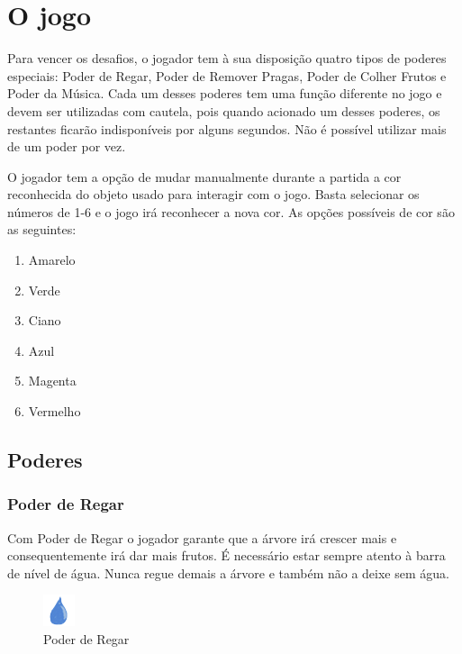 \documentclass[12pt]{article}
\begin{document}
\section{O jogo}

 Para vencer os desafios, o jogador tem \`a sua disposi\c c\~ao quatro tipos de poderes especiais: Poder de Regar,
 Poder de Remover Pragas, Poder de Colher Frutos e Poder da M\'usica. Cada um desses poderes tem uma fun\c c\~ao
 diferente no jogo e devem ser utilizadas com cautela, pois quando acionado um desses poderes, os restantes ficar\~ao
 indispon\'iveis por alguns segundos. N\~ao \'e poss\'ivel utilizar mais de um poder por vez.

 O jogador tem a op\c c\~ao de mudar manualmente durante a partida a cor reconhecida do objeto usado para interagir com o jogo.
 Basta selecionar os n\'umeros de 1-6 e o jogo ir\'a reconhecer a nova cor. As op\c c\~oes poss\'iveis de cor s\~ao as
 seguintes:
 
 \begin{enumerate}
 	\item Amarelo
 	\item Verde
 	\item Ciano
 	\item Azul
 	\item Magenta
 	\item Vermelho
 \end{enumerate}
 
 \subsection{Poderes}
 \subsubsection{Poder de Regar} 
 Com Poder de Regar o jogador garante que a \'arvore ir\'a crescer mais e consequentemente ir\'a
 dar mais frutos. \'E necess\'ario estar sempre atento \`a barra de n\'ivel de \'agua. Nunca regue demais a
 \'arvore e tamb\'em n\~ao a deixe sem \'agua.
 
	\begin{figure}[ht!]
	\begin{center}
		\includegraphics[scale=1.1]{img/icone_gota.png}
		\footnotesize \caption{Poder de Regar }
	\end{center}
	\end{figure}	
  
\end{document}
